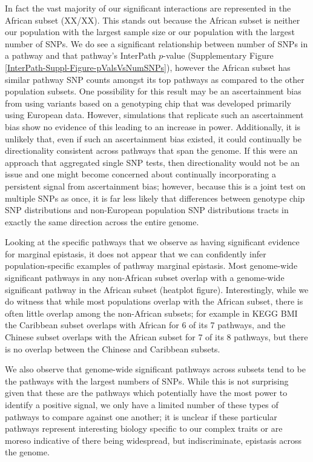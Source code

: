 \documentclass[12pt, a4paper]{article}
\begin{document}
In fact the vast majority of our significant interactions are represented in the African subset (XX/XX). This stands out because the African subset is neither our population with the largest sample size or our population with the largest number of SNPs. We do see a significant relationship between number of SNPs in a pathway and that pathway's InterPath $p$-value (Supplementary Figure \ref{InterPath-Suppl-Figure-pValsVsNumSNPs}), however the African subset has similar pathway SNP counts amongst its top pathways as compared to the other population subsets. One possibility for this result may be an ascertainment bias from using variants based on a genotyping chip that was developed primarily using European data. However, simulations that replicate such an ascertainment bias show no evidence of this leading to an increase in power. Additionally, it is unlikely that, even if such an ascertainment bias existed, it could continually be directionality consistent across pathways that span the genome. If this were an approach that aggregated single SNP tests, then directionality would not be an issue and one might become concerned about continually incorporating a persistent signal from ascertainment bias; however, because this is a joint test on multiple SNPs as once, it is far less likely that differences between genotype chip SNP distributions and non-European population SNP distributions tracts in exactly the same direction across the entire genome. 



Looking at the specific pathways that we observe as having significant evidence for marginal epistasis, it does not appear that we can confidently infer population-specific examples of pathway marginal epistasis. Most genome-wide significant pathways in any non-African subset overlap with a genome-wide significant pathway in the African subset (heatplot figure). Interestingly, while we do witness that while most populations overlap with the African subset, there is often little overlap among the non-African subsets; for example in KEGG BMI the Caribbean subset overlaps with African for 6 of its 7 pathways, and the Chinese subset overlaps with the African subset for 7 of its 8 pathways, but there is no overlap between the Chinese and Caribbean subsets.

We also observe that genome-wide significant pathways across subsets tend to be the pathways with the largest numbers of SNPs. While this is not surprising given that these are the pathways which potentially have the most power to identify a positive signal, we only have a limited number of these types of pathways to compare against one another; it is unclear if these particular pathways represent interesting biology specific to our complex traits or are moreso indicative of there being widespread, but indiscriminate, epistasis across the genome. 
\end{document}
